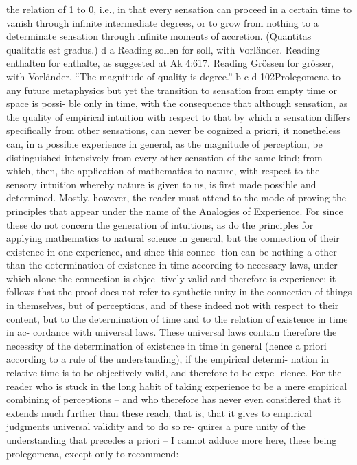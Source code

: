 the relation of 1 to 0, i.e., in that every sensation can proceed in a certain
time to vanish through inﬁnite intermediate degrees, or to grow from nothing
to a determinate sensation through inﬁnite moments of accretion. (Quantitas
qualitatis est gradus.) d
a Reading sollen for soll, with Vorländer.
Reading enthalten for enthalte, as suggested at Ak 4:617.
Reading Grössen for grösser, with Vorländer.
“The magnitude of quality is degree.”
b
c
d
102Prolegomena to any future metaphysics
but yet the transition to sensation from empty time or space is possi-
ble only in time, with the consequence that although sensation, as the
quality of empirical intuition with respect to that by which a sensation
differs speciﬁcally from other sensations, can never be cognized a priori,
it nonetheless can, in a possible experience in general, as the magnitude
of perception, be distinguished intensively from every other sensation
of the same kind; from which, then, the application of mathematics to
nature, with respect to the sensory intuition whereby nature is given to
us, is ﬁrst made possible and determined.
Mostly, however, the reader must attend to the mode of proving the
principles that appear under the name of the Analogies of Experience.
For since these do not concern the generation of intuitions, as do the
principles for applying mathematics to natural science in general, but the
connection of their existence in one experience, and since this connec-
tion can be nothing a other than the determination of existence in time
according to necessary laws, under which alone the connection is objec-
tively valid and therefore is experience: it follows that the proof does not
refer to synthetic unity in the connection of things in themselves, but of
perceptions, and of these indeed not with respect to their content, but to
the determination of time and to the relation of existence in time in ac-
cordance with universal laws. These universal laws contain therefore the
necessity of the determination of existence in time in general (hence a
priori according to a rule of the understanding), if the empirical determi-
nation in relative time is to be objectively valid, and therefore to be expe-
rience. For the reader who is stuck in the long habit of taking experience
to be a mere empirical combining of perceptions – and who therefore has
never even considered that it extends much further than these reach, that
is, that it gives to empirical judgments universal validity and to do so re-
quires a pure unity of the understanding that precedes a priori – I cannot
adduce more here, these being prolegomena, except only to recommend:
